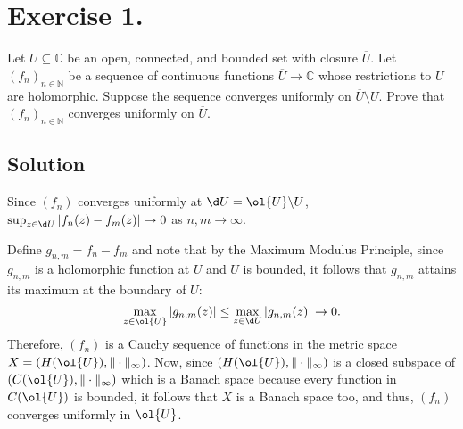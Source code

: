 
\section{Exercise 1.}

Let \( U \subseteq \mathbb{C} \) be an open, connected, and bounded set with closure \(\overline{U}\). Let \((f_n)_{n \in \mathbb{N}}\) be a sequence of continuous functions \( \overline{U} \to \mathbb{C} \) whose restrictions to \( U \) are holomorphic. Suppose the sequence converges uniformly on \(\overline{U} \setminus U\). Prove that \((f_n)_{n \in \mathbb{N}}\) converges uniformly on \(\overline{U}\).

\subsection*{Solution}

Since $(f_n)$ converges uniformly at $\d U = \ol{U} \backslash U$, $\sup_{z \in \d U} |f_n(z) - f_m(z)| \to 0$ as $n, m \to \infty$.

Define $g_{n,m} = f_n - f_m$ and note that by the Maximum Modulus Principle, since $g_{n,m}$ is a holomorphic function at $U$ and $U$ is bounded, it follows that $g_{n,m}$ attains its maximum at the boundary of $U$:
\[ \max_{z\in \ol{U}} |g_{n,m}(z)| \leq \max_{z \in \d U} |g_{n,m}(z)| \to 0. \]
Therefore, $(f_n)$ is a Cauchy sequence of functions in the metric space $X = (H(\ol{U}), \|\cdot\|_\infty)$. Now, since $(H(\ol{U}), \|\cdot\|_\infty)$ is a closed subspace of $(C(\ol{U}), \|\cdot\|_\infty)$ which is a Banach space because every function in $C(\ol{U})$ is bounded, it follows that $X$ is a Banach space too, and thus, $(f_n)$ converges uniformly in $\ol{U}$.
